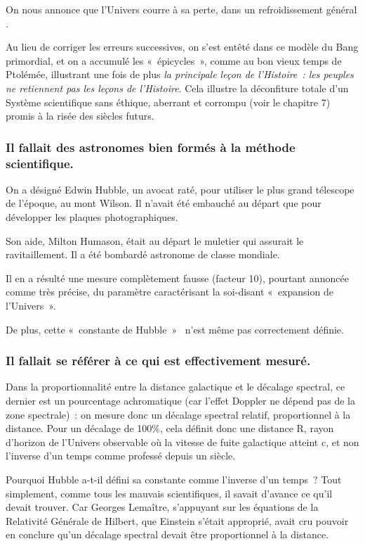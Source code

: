 \documentclass[a4paper,12pt]{article}
\begin{document}
On nous annonce que l’Univers courre à sa perte, dans un refroidissement général . 

Au lieu de corriger les erreurs successives, on s’est ent\^eté dans ce modèle du Bang primordial, et on a accumulé les « épicycles », comme au bon vieux temps de Ptolémée, illustrant une fois de plus \textit{la principale leçon de l'Histoire : les peuples ne retiennent pas les leçons de l'Histoire}. Cela illustre la déconfiture totale d'un Système scientifique sans éthique,  aberrant et corrompu (voir le chapitre 7) promis à  la risée des siècles futurs.



\subsubsection{Il fallait des astronomes bien formés à la méthode scientifique.}

 On a désigné Edwin Hubble, un avocat raté, pour utiliser le plus grand télescope de l’époque, au mont Wilson. Il n’avait été embauché au départ que pour développer les plaques photographiques.


 Son aide, Milton Humason, était au départ le muletier qui assurait le ravitaillement. Il a  été bombardé astronome de classe mondiale.


Il en a résulté une mesure complètement fausse (facteur 10), pourtant annoncée comme très précise, du paramètre caractérisant la soi-disant « expansion de l’Univers ».


De plus, cette « constante de Hubble »  n’est m\^eme pas correctement définie.




\subsubsection{Il fallait se référer à ce qui est effectivement mesuré.}

Dans la proportionnalité entre la distance galactique et le décalage spectral, ce dernier est un pourcentage achromatique (car l'effet Doppler ne dépend pas de la zone spectrale) : on mesure donc un décalage spectral relatif, proportionnel à la distance. Pour un décalage de 100\%, cela définit donc une distance R, rayon d'horizon de l'Univers observable où la vitesse de fuite galactique atteint c, et non l'inverse d'un temps comme professé depuis un siècle.


Pourquoi Hubble a-t-il défini sa constante comme l’inverse d’un temps ? Tout simplement, comme tous les mauvais scientifiques, il savait d’avance ce qu’il devait trouver. Car Georges Lema\^itre, s’appuyant sur les équations de la Relativité Générale de Hilbert, que Einstein s’était approprié,  avait cru pouvoir en conclure qu’un décalage spectral devait être proportionnel à la distance.
\end{document}
